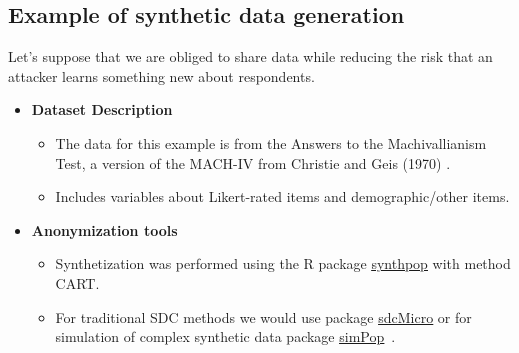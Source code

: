 \documentclass[a0,portrait]{a0poster}
\begin{document}
\begin{multicols}{3}

\section{Example of synthetic data generation}

Let's suppose that we are obliged to share data 
while reducing the risk that an attacker learns something new about respondents.

\begin{itemize}
    \item[\ding{228}] \textbf{Dataset Description}
        \begin{itemize}   
            \item[\textbullet] The data for this example is from the Answers to the Machivallianism Test, a version of the MACH-IV from Christie and Geis (1970) \cite{Data}.
            \item[\textbullet] Includes variables about Likert-rated items and demographic/other items.
        \end{itemize}
    \item[\ding{228}] \textbf{Anonymization tools}
        \begin{itemize}   
            \item[\textbullet] Synthetization was performed using the R package  \href{https://cran.r-project.org/web/packages/synthpop/index.html} {\color{blue}\underline{synthpop}} \cite{2022_Synthpop} with method CART.
            \item[\textbullet]  For traditional SDC methods we would use package \href{https://cran.r-project.org/web/packages/sdcMicro/index.html}{\color{blue}\underline{sdcMicro}} \cite{2024_Sdcmicro} or for simulation of  complex synthetic data package \href{https://cran.r-project.org/web/packages/simPop/index.html}{\color{blue}\underline{simPop}}~\cite{2022_Simpop}.
        \end{itemize}
\end{itemize}


\end{multicols}
\end{document}
